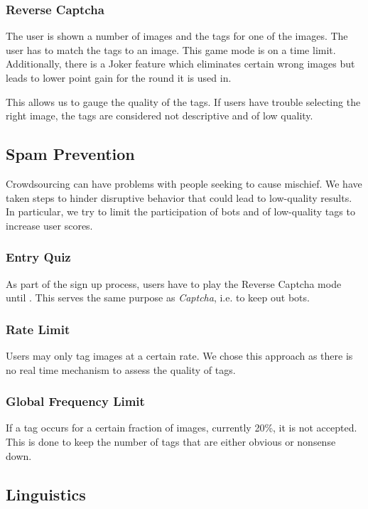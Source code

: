 \subsubsection{Reverse Captcha}

The user is shown a number of images and the tags for one of the images. The user has to match the tags to an image.
This game mode is on a time limit. Additionally, there is a Joker feature which eliminates certain wrong images but leads to lower point gain for the round it is used in.

This allows us to gauge the quality of the tags. If users have trouble selecting the right image, the tags are considered not descriptive and of low quality.


\subsection{Spam Prevention}

Crowdsourcing can have problems with people seeking to cause mischief. We have taken steps to hinder disruptive behavior that could lead to low-quality results. In particular, we try to limit the participation of bots and  of low-quality tags to increase user scores.


\subsubsection{Entry Quiz}

As part of the sign up process, users have to play the Reverse Captcha mode until . This serves the same purpose as \textit{Captcha}, i.e. to keep out bots.


\subsubsection{Rate Limit}
Users may only tag images at a certain rate. We chose this approach as there is no real time mechanism to assess the quality of tags.

\subsubsection{Global Frequency Limit}
If a tag occurs for a certain fraction of images, currently 20\%, it is not accepted. This is done to keep the number of tags that are either obvious or nonsense down.




\subsection{Linguistics}

